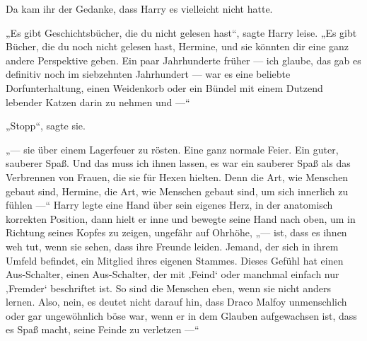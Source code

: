Da kam ihr der Gedanke, dass Harry es vielleicht nicht hatte.

„Es gibt Geschichtsbücher, die du nicht gelesen hast“, sagte Harry leise.
„Es gibt Bücher, die du noch nicht gelesen hast, Hermine, und sie könnten dir eine ganz andere Perspektive geben. Ein paar Jahrhunderte früher — ich glaube, das gab es definitiv noch im siebzehnten Jahrhundert — war es eine beliebte Dorfunterhaltung, einen Weidenkorb oder ein Bündel mit einem Dutzend lebender Katzen darin zu nehmen und —“

„Stopp“, sagte sie.

„— sie über einem Lagerfeuer zu rösten. Eine ganz normale Feier. Ein guter, sauberer Spaß. Und das muss ich ihnen lassen, es war ein sauberer Spaß als das Verbrennen von Frauen, die sie für Hexen hielten. Denn die Art, wie Menschen gebaut sind, Hermine, die Art, wie Menschen gebaut sind, um sich innerlich zu fühlen —“ Harry legte eine Hand über sein eigenes Herz, in der anatomisch korrekten Position, dann hielt er inne und bewegte seine Hand nach oben, um in Richtung seines Kopfes zu zeigen, ungefähr auf Ohrhöhe, „— ist, dass es ihnen weh tut, wenn sie sehen, dass ihre Freunde leiden. Jemand, der sich in ihrem Umfeld befindet, ein Mitglied ihres eigenen Stammes. Dieses Gefühl hat einen Aus-Schalter, einen Aus-Schalter, der mit ‚Feind‘ oder manchmal einfach nur ‚Fremder‘ beschriftet ist. So sind die Menschen eben, wenn sie nicht anders lernen. Also, nein, es deutet nicht darauf hin, dass Draco Malfoy unmenschlich oder gar ungewöhnlich böse war, wenn er in dem Glauben aufgewachsen ist, dass es Spaß macht, seine Feinde zu verletzen —“

